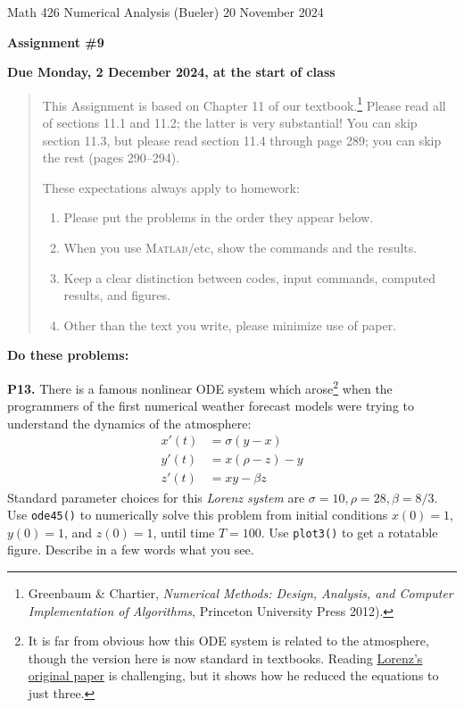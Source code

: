 \documentclass[12pt]{amsart}
\newcommand{\Matlab}{\textsc{Matlab}\xspace}
\newcommand{\prob}[1]{\bigskip\noindent\textbf{#1.}\quad }
\begin{document}
\scriptsize \noindent Math 426 Numerical Analysis (Bueler) \hfill 20 November 2024
\normalsize

\medskip\bigskip

\Large\centerline{\textbf{Assignment \#9}}
\large
\bigskip

\centerline{\textbf{Due Monday, 2 December 2024, at the start of class}}
\medskip
\normalsize

\thispagestyle{empty}

\begin{quote}
{\small
This Assignment is based on Chapter 11 of our textbook.\footnote{Greenbaum \& Chartier, \emph{Numerical Methods: Design, Analysis, and Computer Implementation of Algorithms}, Princeton University Press 2012).}  Please read all of sections 11.1 and 11.2; the latter is very substantial!  You can skip section 11.3, but please read section 11.4 through page 289; you can skip the rest (pages 290--294).

\medskip
\noindent These expectations always apply to homework:
\renewcommand{\labelenumi}{\arabic{enumi}.\,}
\begin{enumerate}
\item Please put the problems in the order they appear below.
\item When you use \Matlab/etc, show the commands and the results.
\item Keep a clear distinction between codes, input commands, computed results, and figures.
\item Other than the text you write, please minimize use of paper.
\end{enumerate}
}
\end{quote}

\medskip
\noindent \textbf{Do these problems:}


\prob{P13}  There is a famous nonlinear ODE system which arose\footnote{It is far from obvious how this ODE system is related to the atmosphere, though the version here is now standard in textbooks.  Reading \href{https://www.tandfonline.com/doi/pdf/10.3402/tellusa.v12i3.9406}{Lorenz's original paper} is challenging, but it shows how he reduced the equations to just three.} when the programmers of the first numerical weather forecast models were trying to understand the dynamics of the atmosphere:
\begin{align*}
x'(t) &= \sigma (y - x) \\
y'(t) &= x (\rho - z) - y \\
z'(t) &= x y - \beta z
\end{align*}
Standard parameter choices for this \emph{Lorenz system} are $\sigma=10, \rho=28, \beta=8/3$.  Use \texttt{ode45()} to numerically solve this problem from initial conditions $x(0)=1$, $y(0)=1$, and $z(0)=1$, until time $T=100$.  Use \texttt{plot3()} to get a rotatable figure.  Describe in a few words what you see.
\end{document}
